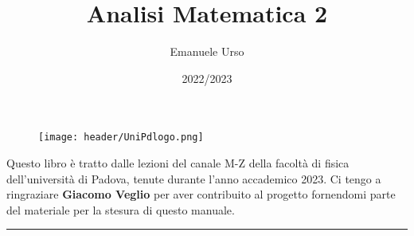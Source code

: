 \documentclass[a4paper]{article}
\begin{document}
	

	
	\title{\Huge Analisi Matematica 2}
	\author{{\Large Emanuele Urso} \\
	{\small{\href{mailto:emanuele.urso@studenti.unipd.it}{\color{black}{emanuele.urso@studenti.unipd.it} }}}}
	\date{2022/2023}
	\maketitle
	
	\begin{figure}[!h]
		\centering
		\texttt{[image: header/UniPdlogo.png]}
	\end{figure}
	
	\vfill
	
	Questo libro è tratto dalle lezioni del canale M-Z della facoltà di fisica dell'università di Padova, tenute durante l'anno accademico 2023. Ci tengo a ringraziare \textbf{Giacomo Veglio} per aver contribuito al progetto fornendomi parte del materiale per la stesura di questo manuale.
	
	\vspace{10em}
	
	
	\begin{center}
		\rule{.9\textwidth}{0.4pt}%
	\end{center}
	
	\hypersetup{linkcolor=black}
	\tableofcontents   
	
\newpage



\newpage



\newpage



\newpage



\newpage


\end{document}
